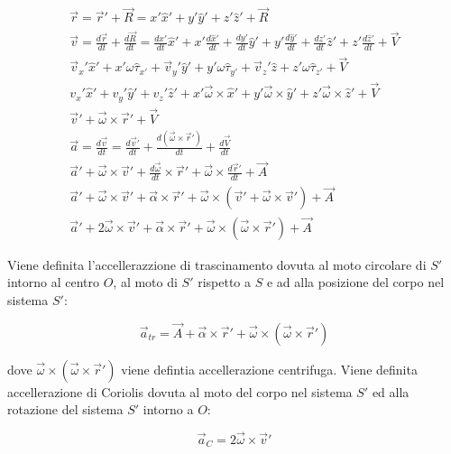 \documentclass{article}
\numberwithin{equation}{subsection}
\begin{document}
\begin{gather}
    \vec{r}=\vec{r}'+\vec{R}=x'\hat{x}'+y'\hat{y}'+z'\hat{z}'+\vec{R}\\
    \vec{v}=\displaystyle\frac{d\vec{r}}{dt}+\frac{d\vec{R}}{dt}=\frac{dx'}{dt}\hat{x}'+x'\frac{d\hat{x}'}{dt}+\frac{dy'}{dt}\hat{y}'+y'\frac{d\hat{y}'}{dt}+\frac{dz'}{dt}\hat{z}'+z'\frac{d\hat{z}'}{dt}+\vec{V}\\
    \vec{v}_x'\hat{x}'+x'\omega\hat{\tau}_{x'}+\vec{v}_y'\hat{y}'+y'\omega\hat{\tau}_{y'}+\vec{v}_z'\hat{z}+z'\omega\hat{\tau}_{z'}+\vec{V}\\
    v_x'\hat{x}'+v_y'\hat{y}'+v_z'\hat{z}'+x'\vec{\omega}\times\hat{x}'+y'\vec{\omega}\times\hat{y}'+z'\vec{\omega}\times\hat{z}'+\vec{V}\\
    \vec{v}'+\vec{\omega}\times\vec{r}'+\vec{V}\\
    \vec{a}=\displaystyle\frac{d\vec{v}}{dt}=\frac{d\vec{v}'}{dt}+\frac{d(\vec{\omega}\times\vec{r}')}{dt}+\frac{d\vec{V}}{dt}\\
    \vec{a}'+\vec{\omega}\times\vec{v}'+\displaystyle\frac{d\vec{\omega}}{dt}\times\vec{r}'+\vec{\omega}\times\frac{d\vec{r}'}{dt}+\vec{A}\\
    \vec{a}'+\vec{\omega}\times\vec{v}'+\vec{\alpha}\times\vec{r}'+\vec{\omega}\times(\vec{v}'+\vec{\omega}\times\vec{v}')+\vec{A}\\
    \vec{a}'+2\vec{\omega}\times\vec{v}'+\vec{\alpha}\times\vec{r}'+\vec{\omega}\times(\vec{\omega}\times\vec{r}')+\vec{A}
\end{gather}

Viene definita l'accellerazzione di trascinamento dovuta al moto 
circolare di $S'$ intorno al centro $O$, al moto di $S'$ rispetto 
a $S$ e ad alla posizione del corpo nel sistema $S'$: 

\begin{equation}
    \vec{a}_{tr}=\vec{A}+\vec{\alpha}\times\vec{r}'+\vec{\omega}\times(\vec{\omega}\times\vec{r}')
\end{equation}

dove $\vec{\omega}\times(\vec{\omega}\times\vec{r}')$ viene 
defintia accellerazione centrifuga.
Viene definita accellerazione di Coriolis dovuta al moto del 
corpo nel sistema $S'$ ed alla rotazione del sistema $S'$ 
intorno a $O$:

\begin{equation}
     \vec{a}_C=2\vec{\omega}\times\vec{v}'
\end{equation}
\end{document}
